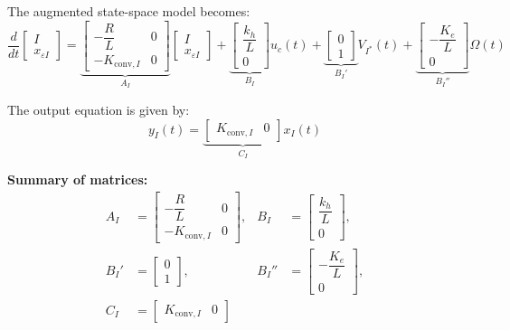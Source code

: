 \documentclass{rapportCS}
\begin{document}
The augmented state-space model becomes:
\begin{equation*}
\frac{d}{dt}
\begin{bmatrix}
I \\[4pt]
x_{\varepsilon I}
\end{bmatrix}
=
\underbrace{
\begin{bmatrix}
-\dfrac{R}{L} & 0 \\[6pt]
- K_{\mathrm{conv},I} & 0
\end{bmatrix}}_{A_I}
\begin{bmatrix}
I \\[4pt]
x_{\varepsilon I}
\end{bmatrix}
+
\underbrace{
\begin{bmatrix}
\dfrac{k_h}{L} \\[4pt]
0
\end{bmatrix}}_{B_I}
u_c(t)
+
\underbrace{
\begin{bmatrix}
0 \\[4pt]
1
\end{bmatrix}}_{B_I'}
V_{I^*}(t)
+
\underbrace{
\begin{bmatrix}
-\dfrac{K_e}{L} \\[4pt]
0
\end{bmatrix}}_{B_I''}
\Omega(t)
\end{equation*}

The output equation is given by:
\begin{equation*}
y_I(t) =
\underbrace{\begin{bmatrix}
K_{\mathrm{conv},I} & 0
\end{bmatrix}}_{C_I}
x_I(t)
\end{equation*}

\noindent\textbf{Summary of matrices:}
\begin{align*}
A_I &=
\begin{bmatrix}
-\dfrac{R}{L} & 0 \\[4pt]
- K_{\mathrm{conv},I} & 0
\end{bmatrix},
&
B_I &=
\begin{bmatrix}
\dfrac{k_h}{L} \\[4pt]
0
\end{bmatrix},\\[6pt]
B_I' &=
\begin{bmatrix}
0 \\[4pt]
1
\end{bmatrix},
&
B_I'' &=
\begin{bmatrix}
-\dfrac{K_e}{L} \\[4pt]
0
\end{bmatrix},\\[6pt]
C_I &=
\begin{bmatrix}
K_{\mathrm{conv},I} & 0
\end{bmatrix}
\end{align*}
\end{document}
